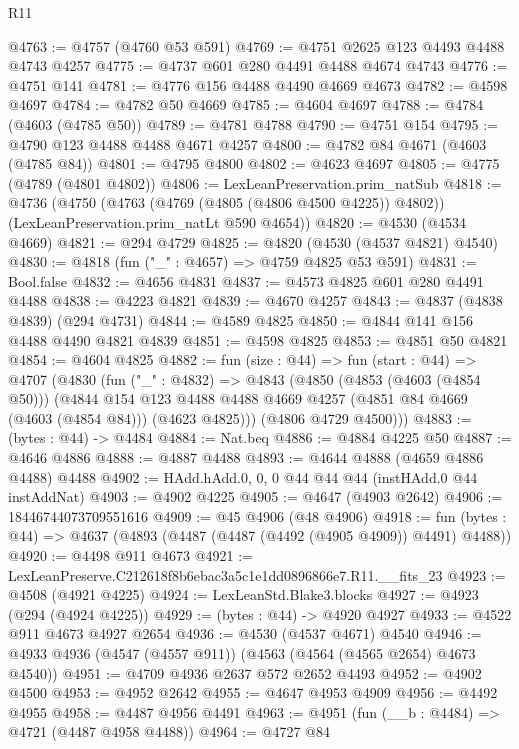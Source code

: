 \begin{lexlean}{R11}
\begin{coremodule}
@4763 := @4757 (@4760 @53 @591)
@4769 := @4751 @2625 @123 @4493 @4488 @4743 @4257
@4775 := @4737 @601 @280 @4491 @4488 @4674 @4743
@4776 := @4751 @141
@4781 := @4776 @156 @4488 @4490 @4669 @4673
@4782 := @4598 @4697
@4784 := @4782 @50 @4669
@4785 := @4604 @4697
@4788 := @4784 (@4603 (@4785 @50))
@4789 := @4781 @4788
@4790 := @4751 @154
@4795 := @4790 @123 @4488 @4488 @4671 @4257
@4800 := @4782 @84 @4671 (@4603 (@4785 @84))
@4801 := @4795 @4800
@4802 := @4623 @4697
@4805 := @4775 (@4789 (@4801 @4802))
@4806 := LexLeanPreservation.prim_natSub
@4818 := @4736
    (@4750
      (@4763 (@4769 (@4805 (@4806 @4500 @4225)) @4802))
      (LexLeanPreservation.prim_natLt @590 @4654))
@4820 := @4530 (@4534 @4669)
@4821 := @294 @4729
@4825 := @4820 (@4530 (@4537 @4821) @4540)
@4830 := @4818 (fun ("_" : @4657) => @4759 @4825 @53 @591)
@4831 := Bool.false
@4832 := @4656 @4831
@4837 := @4573 @4825 @601 @280 @4491 @4488
@4838 := @4223 @4821
@4839 := @4670 @4257
@4843 := @4837 (@4838 @4839) (@294 @4731)
@4844 := @4589 @4825
@4850 := @4844 @141 @156 @4488 @4490 @4821 @4839
@4851 := @4598 @4825
@4853 := @4851 @50 @4821
@4854 := @4604 @4825
@4882 := fun (size : @44) =>
  fun (start : @44) =>
  @4707
    (@4830
      (fun ("_" : @4832) =>
      @4843
        (@4850
          (@4853 (@4603 (@4854 @50)))
          (@4844
            @154
            @123
            @4488
            @4488
            @4669
            @4257
            (@4851 @84 @4669 (@4603 (@4854 @84)))
            (@4623 @4825)))
        (@4806 @4729 @4500)))
@4883 := (bytes : @44) -> @4484
@4884 := Nat.beq
@4886 := @4884 @4225 @50
@4887 := @4646 @4886
@4888 := @4887 @4488
@4893 := @4644 @4888 (@4659 @4886 @4488) @4488
@4902 := HAdd.hAdd.{0, 0, 0} @44 @44 @44 (instHAdd.{0} @44 instAddNat)
@4903 := @4902 @4225
@4905 := @4647 (@4903 @2642)
@4906 := 18446744073709551616
@4909 := @45 @4906 (@48 @4906)
@4918 := fun (bytes : @44) => @4637 (@4893 (@4487 (@4487 (@4492 (@4905 @4909)) @4491) @4488))
@4920 := @4498 @911 @4673
@4921 := LexLeanPreserve.C212618f8b6ebac3a5c1e1dd0896866e7.R11.__fits_23
@4923 := @4508 (@4921 @4225)
@4924 := LexLeanStd.Blake3.blocks
@4927 := @4923 (@294 (@4924 @4225))
@4929 := (bytes : @44) -> @4920 @4927
@4933 := @4522 @911 @4673 @4927 @2654
@4936 := @4530 (@4537 @4671) @4540
@4946 := @4933 @4936 (@4547 (@4557 @911)) (@4563 (@4564 (@4565 @2654) @4673 @4540))
@4951 := @4709 @4936 @2637 @572 @2652 @4493
@4952 := @4902 @4500
@4953 := @4952 @2642
@4955 := @4647 @4953 @4909
@4956 := @4492 @4955
@4958 := @4487 @4956 @4491
@4963 := @4951 (fun (__b : @4484) => @4721 (@4487 @4958 @4488))
@4964 := @4727 @84

\end{coremodule}
\end{lexlean}
